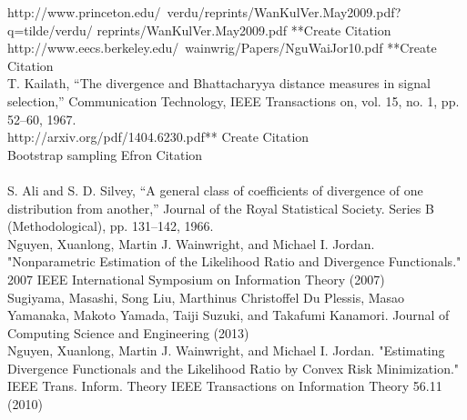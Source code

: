 \documentclass{article}
\begin{document}
	\noindent [12] http://www.princeton.edu/~verdu/reprints/WanKulVer.May2009.pdf?q=tilde/verdu/
	\indent reprints/WanKulVer.May2009.pdf **Create Citation
	\\ [0.5ex]
	
	\noindent [13] http://www.eecs.berkeley.edu/~wainwrig/Papers/NguWaiJor10.pdf **Create Citation
	\\ [0.5ex]
	
	\noindent [14] T. Kailath, “The divergence and Bhattacharyya distance measures in signal selection,” Communication 
	\indent Technology, IEEE Transactions on, vol. 15, no. 1, pp. 52–60, 1967.
	\\ [0.5ex]

	
	\noindent [16] http://arxiv.org/pdf/1404.6230.pdf** Create Citation
	\\ [0.5ex]
	
	\noindent [17] Bootstrap sampling Efron Citation
	\\ [0.5ex]
	
	\noindent [18]
	\\ [0.5ex]
	
	\noindent [19] S. Ali and S. D. Silvey, “A general class of coefficients of divergence of one distribution from 
	\indent another,” Journal of the Royal Statistical Society.
	Series B (Methodological), pp. 131–142, 1966.
	\\ [0.5ex]
	
	\noindent [20] Nguyen, Xuanlong, Martin J. Wainwright, and Michael I. Jordan. "Nonparametric Estimation 
	\indent of the Likelihood Ratio and Divergence Functionals." 2007 IEEE International Symposium on 
	\indent Information Theory (2007)
	\\ [0.5ex]

	\noindent [21] Sugiyama, Masashi, Song Liu, Marthinus Christoffel Du Plessis, Masao Yamanaka, Makoto 
	\indent Yamada, Taiji Suzuki, and Takafumi Kanamori. Journal of Computing Science and Engineering 
	 (2013)
	\\ [0.5ex]
	
	\noindent [22] Nguyen, Xuanlong, Martin J. Wainwright, and Michael I. Jordan. "Estimating Divergence
	\indent Functionals and the Likelihood Ratio by Convex Risk Minimization." IEEE Trans. Inform. 
	\indent Theory IEEE Transactions on Information Theory 56.11 (2010)
	\\ [0.5ex]
\end{document}
